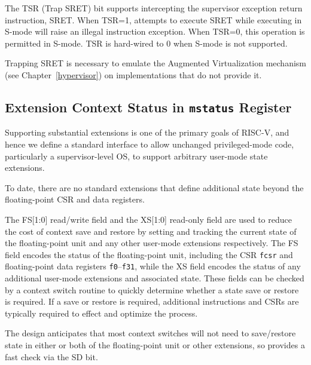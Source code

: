 The TSR (Trap SRET) bit supports intercepting the supervisor exception return
instruction, SRET.  When TSR=1, attempts to execute SRET while executing in
S-mode will raise an illegal instruction exception.  When TSR=0, this
operation is permitted in S-mode.  TSR is hard-wired to 0 when S-mode is not
supported.

\begin{commentary}
Trapping SRET is necessary to emulate the Augmented Virtualization mechanism
(see Chapter~\ref{hypervisor}) on implementations that do not provide it.
\end{commentary}

\subsection{Extension Context Status in {\tt mstatus} Register}

Supporting substantial extensions is one of the primary goals of
RISC-V, and hence we define a standard interface to allow unchanged
privileged-mode code, particularly a supervisor-level OS, to support
arbitrary user-mode state extensions.

\begin{commentary}
  To date, there are no standard extensions that define additional
  state beyond the floating-point CSR and data registers.
\end{commentary}

The FS[1:0] read/write field and the XS[1:0] read-only field are used
to reduce the cost of context save and restore by setting and tracking
the current state of the floating-point unit and any other user-mode
extensions respectively.  The FS field encodes the status of the
floating-point unit, including the CSR {\tt fcsr} and floating-point
data registers {\tt f0}--{\tt f31}, while the XS field encodes the
status of any additional user-mode extensions and associated state.
These fields can be checked by a context switch routine to quickly
determine whether a state save or restore is required.  If a save or
restore is required, additional instructions and CSRs are typically
required to effect and optimize the process.

\begin{commentary}
  The design anticipates that most context switches will not need to
  save/restore state in either or both of the floating-point unit or
  other extensions, so provides a fast check via the SD bit.
\end{commentary}

